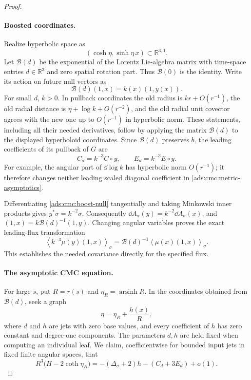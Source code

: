 \begin{proof}
\paragraph{Boosted coordinates.}
Realize hyperbolic space as
\[
 (\cosh\eta,\sinh\eta\,x)\subset\mathbb R^{3,1}.
\]
Let \(\mathcal B(d)\) be the exponential of the Lorentz Lie-algebra
matrix with time-space entries \(d\in\mathbb R^3\) and zero spatial
rotation part.  Thus \(\mathcal B(0)\) is the identity.
Write its action on future null vectors as
\begin{equation}\label{ads:cmc:boost-null}
 \mathcal B(d)(1,x)=k(x)(1,y(x)).
\end{equation}
For small \(d\), \(k>0\).
In pullback coordinates the old radius is \(kr+O(r^{-1})\), the old
radial distance is \(\eta+\log k+O(r^{-2})\), and the old radial unit
covector agrees with the new one up to \(O(r^{-1})\) in hyperbolic
norm.  These statements, including all their needed derivatives,
follow by applying the matrix \(\mathcal B(d)\) to the displayed
hyperboloid coordinates.  Since \(\mathcal B(d)\) preserves \(b\),
the leading coefficients of its pullback of \(G\) are
\begin{equation}\label{ads:cmc:boost-aspect}
 C_d=k^{-3}C\circ y,\qquad E_d=k^{-3}E\circ y.
\end{equation}
For example, the angular part of \(\dd\log k\) has hyperbolic norm
\(O(r^{-1})\); it therefore changes neither leading scaled diagonal
coefficient in \eqref{ads:cmc:metric-asymptotics}.

Differentiating \eqref{ads:cmc:boost-null} tangentially and taking
Minkowski inner products gives \(y^*\sigma=k^{-2}\sigma\).
Consequently \(\dd A_\sigma(y)=k^{-2}\dd A_\sigma(x)\), and
\((1,x)=k\mathcal B(d)^{-1}(1,y)\).  Changing angular variables proves
the exact leading-flux transformation
\begin{equation}\label{ads:cmc:boost-mass}
 \left\langle k^{-3}\mu(y)(1,x)\right\rangle_\sigma
 =\mathcal B(d)^{-1}\left\langle\mu(x)(1,x)\right\rangle_\sigma.
\end{equation}
This establishes the needed covariance directly for the specified
flux.

\paragraph{The asymptotic CMC equation.}
For large \(s\), put \(R=r(s)\) and \(\eta_R=\operatorname{arsinh}R\).
In the coordinates obtained from \(\mathcal B(d)\), seek a graph
\begin{equation}\label{ads:cmc:far-graph}
 \eta=\eta_R+\frac{h(x)}{R},
\end{equation}
where \(d\) and \(h\) are jets with zero base values, and every
coefficient of \(h\) has zero constant and degree-one components.
The parameters \(d,h\) are held fixed when computing an individual
leaf.  We claim, coefficientwise for bounded input jets in fixed
finite angular spaces, that
\begin{equation}\label{ads:cmc:mean-curvature-asymptotic}
 R^3\bigl(H-2\coth\eta_R\bigr)
 =-(\Delta_\sigma+2)h-(C_d+3E_d)+o(1).
\end{equation}


\end{proof}
